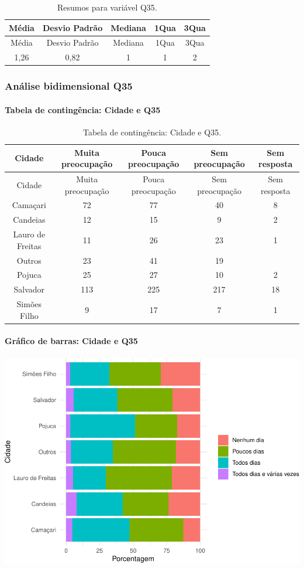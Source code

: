 \documentclass[]{article}
\let\oldparagraph\paragraph
\renewcommand{\paragraph}[1]{\oldparagraph{#1}\mbox{}}
\begin{document}
\begin{longtable}[]{@{}ccccc@{}}
\caption{\label{tab:unnamed-chunk-1251}Resumos para variável Q35.}\tabularnewline
\toprule
Média & Desvio Padrão & Mediana & 1Qua & 3Qua\tabularnewline
\midrule
\endfirsthead
\toprule
Média & Desvio Padrão & Mediana & 1Qua & 3Qua\tabularnewline
\midrule
\endhead
1,26 & 0,82 & 1 & 1 & 2\tabularnewline
\bottomrule
\end{longtable}

\cleardoublepage

\hypertarget{anuxe1lise-bidimensional-q35}{%
\subsubsection{Análise bidimensional Q35}\label{anuxe1lise-bidimensional-q35}}

\hypertarget{tabela-de-continguxeancia-cidade-e-q35}{%
\paragraph{Tabela de contingência: Cidade e Q35}\label{tabela-de-continguxeancia-cidade-e-q35}}

\begin{longtable}[]{@{}ccccc@{}}
\caption{\label{tab:unnamed-chunk-1252}Tabela de contingência: Cidade e Q35.}\tabularnewline
\toprule
Cidade & Muita preocupação & Pouca preocupação & Sem preocupação & Sem resposta\tabularnewline
\midrule
\endfirsthead
\toprule
Cidade & Muita preocupação & Pouca preocupação & Sem preocupação & Sem resposta\tabularnewline
\midrule
\endhead
Camaçari & 72 & 77 & 40 & 8\tabularnewline
Candeias & 12 & 15 & 9 & 2\tabularnewline
Lauro de Freitas & 11 & 26 & 23 & 1\tabularnewline
Outros & 23 & 41 & 19 &\tabularnewline
Pojuca & 25 & 27 & 10 & 2\tabularnewline
Salvador & 113 & 225 & 217 & 18\tabularnewline
Simões Filho & 9 & 17 & 7 & 1\tabularnewline
\bottomrule
\end{longtable}

\hypertarget{gruxe1fico-de-barras-cidade-e-q35}{%
\paragraph{Gráfico de barras: Cidade e Q35}\label{gruxe1fico-de-barras-cidade-e-q35}}

\begin{center}\includegraphics[width=0.75\linewidth]{relatorio_covid19_files/figure-latex/unnamed-chunk-1253-1} \end{center}
\end{document}

